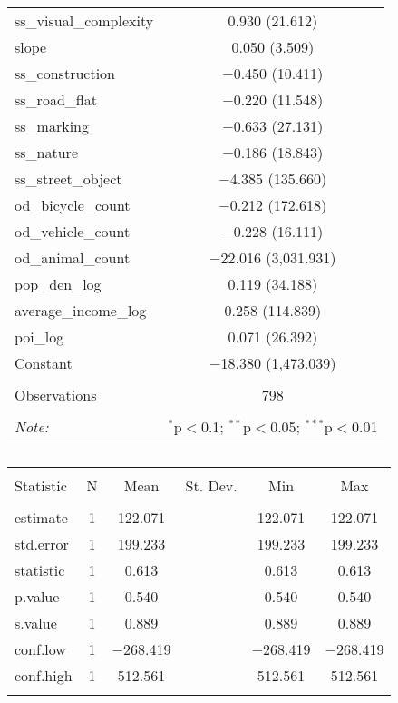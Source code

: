 \begin{table}[!htbp]
\begin{tabular}{@{\extracolsep{1pt}}lc}
  ss\_visual\_complexity & 0.930 (21.612) \\ 
  slope & 0.050 (3.509) \\ 
  ss\_construction & $-$0.450 (10.411) \\ 
  ss\_road\_flat & $-$0.220 (11.548) \\ 
  ss\_marking & $-$0.633 (27.131) \\ 
  ss\_nature & $-$0.186 (18.843) \\ 
  ss\_street\_object & $-$4.385 (135.660) \\ 
  od\_bicycle\_count & $-$0.212 (172.618) \\ 
  od\_vehicle\_count & $-$0.228 (16.111) \\ 
  od\_animal\_count & $-$22.016 (3,031.931) \\ 
  pop\_den\_log & 0.119 (34.188) \\ 
  average\_income\_log & 0.258 (114.839) \\ 
  poi\_log & 0.071 (26.392) \\ 
  Constant & $-$18.380 (1,473.039) \\ 
 \hline \\[-1.8ex] 
Observations & 798 \\ 
\hline 
\hline \\[-1.8ex] 
\textit{Note:}  & \multicolumn{1}{r}{$^{*}$p$<$0.1; $^{**}$p$<$0.05; $^{***}$p$<$0.01} \\ 
\end{tabular} 
\end{table} 

\begin{table}[!htbp] \centering 
  \caption{} 
  \label{} 
\small 
\begin{tabular}{@{\extracolsep{1pt}}lccccc} 
\\[-1.8ex]\hline 
\hline \\[-1.8ex] 
Statistic & \multicolumn{1}{c}{N} & \multicolumn{1}{c}{Mean} & \multicolumn{1}{c}{St. Dev.} & \multicolumn{1}{c}{Min} & \multicolumn{1}{c}{Max} \\ 
\hline \\[-1.8ex] 
estimate & 1 & 122.071 &  & 122.071 & 122.071 \\ 
std.error & 1 & 199.233 &  & 199.233 & 199.233 \\ 
statistic & 1 & 0.613 &  & 0.613 & 0.613 \\ 
p.value & 1 & 0.540 &  & 0.540 & 0.540 \\ 
s.value & 1 & 0.889 &  & 0.889 & 0.889 \\ 
conf.low & 1 & $-$268.419 &  & $-$268.419 & $-$268.419 \\ 
conf.high & 1 & 512.561 &  & 512.561 & 512.561 \\ 
\hline \\[-1.8ex] 
\end{tabular} 
\end{table} 

